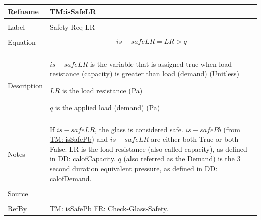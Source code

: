 \documentclass[12pt]{article}
\begin{document}
\noindent \begin{minipage}{\textwidth}
\begin{tabular}{p{} p{}}
\toprule \textbf{Refname} & \textbf{TM:isSafeLR}
\label{TM:isSafeLR}
\\ \midrule \\
Label & Safety Req-LR
        \\ \midrule \\
        Equation & \begin{displaymath}
                   is-safeLR=LR>q
                   \end{displaymath}
                   \\ \midrule \\
                   Description & \begin{symbDescription}
                                 \item{$is-safeLR$ is the variable that is assigned true when load resistance (capacity) is greater than load (demand) (Unitless)}
                                 \item{$LR$ is the load resistance (Pa)}
                                 \item{$q$ is the applied load (demand) (Pa)}
                                 \end{symbDescription}
                                 \\ \midrule \\
                                 Notes & If $is-safeLR$, the glass is considered safe. $is-safePb$ (from \hyperref[TM:isSafePb]{TM: isSafePb}) and $is-safeLR$ are either both True or both False. LR is the load resistance (also called capacity), as defined in \hyperref[DD:calofCapacity]{DD: calofCapacity}. $q$ (also referred as the Demand) is the 3 second duration equivalent pressure, as defined in \hyperref[DD:calofDemand]{DD: calofDemand}.
                                         \\ \midrule \\
                                         Source & \cite{astm2009}
                                                  \\ \midrule \\
                                                  RefBy & \hyperref[TM:isSafePb]{TM: isSafePb} \hyperref[checkGlassSafety]{FR: Check-Glass-Safety}.
\\ \bottomrule \end{tabular}
\end{minipage}
\end{document}
